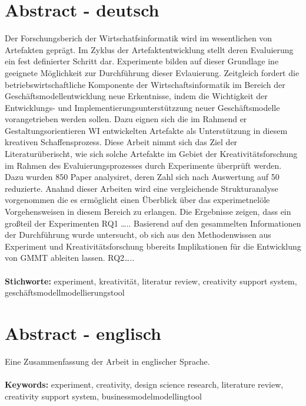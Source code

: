 \section*{Abstract - deutsch}
Der Forschungsberich der Wirtschatfsinformatik wird im wesentlichen von Artefakten geprägt. Im Zyklus der Artefaktentwicklung stellt deren Evaluierung ein fest definierter Schritt dar. Experimente bilden auf dieser Grundlage ine geeignete Möglichkeit zur Durchführung dieser Evlauierung.  Zeitgleich fordert die betriebswirtschaftliche Komponente der Wirtschaftsinformatik im Bereich der Geschäftsmodellentwicklung neue Erkentnisse, indem die Wichtigkeit der Entwicklungs- und Implementierungsunterstützzung neuer Geschäftsmodelle  vorangetrieben werden sollen. Dazu eignen sich die im Rahmend er Gestaltungsorientieren WI entwickelten Artefakte als Unterstützung in diesem kreativen Schaffensprozess.  Diese Arbeit nimmt sich das Ziel der Literaturüberischt, wie sich solche Artefakte im Gebiet der Kreativitätsforschung im Rahmen des Evaluierungsprozesses durch Experimente überprüft werden. Dazu wurden 850 Paper analysiret, deren Zahl sich nach Auswertung auf 50 reduzierte. Anahnd dieser Arbeiten wird eine vergleichende Strukturanalyse vorgenommen die es ermöglicht einen Überblick über das experimetnelöle Vorgehensweisen in diesem Bereich zu erlangen. Die Ergebnisse zeigen, dass ein großteil der Experimenten RQ1 ….. Basierend auf den gesammelten Informationen der Durchführung wurde untersucht, ob sich aus den Methodenwissen aus Experiment und Kreativitätsforschung bbereits Implikationen für die Entwicklung von GMMT ableiten lassen. RQ2…..  \\\\
{\bf Stichworte:} experiment, kreativität, literatur review, creativity support system, geschäftsmodellmodellierungstool

\section*{Abstract - englisch}
Eine Zusammenfassung der Arbeit in englischer Sprache.
\\\\
{\bf Keywords:} experiment, creativity, design science research, literature review, creativity support system, businessmodelmodellingtool 
\\\\\\
